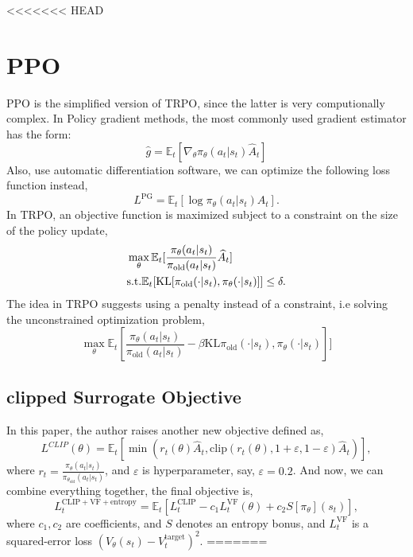 \documentclass[11pt,a4paper]{article}
\def\hat{\widehat}
\def\epsilon{\varepsilon}
\def\E{\mathbb{E}}
\begin{document}
<<<<<<< HEAD
\section{PPO}
PPO\cite{schulman2017proximal} is the simplified version of TRPO, since the latter is very computionally complex. In Policy gradient methods, the most commonly used gradient estimator has the form:
\begin{equation}
\hat{g} = \E_t[\nabla_{\theta}\pi_{\theta}(a_t|s_t)\hat{A}_t]
\end{equation}
Also, use automatic differentiation software, we can optimize the following loss function instead,
\begin{equation}
    L^{\mathrm{PG}} = \E_t[\log\pi_{\theta}(a_t|s_t)A_t].
\end{equation}
In TRPO, an objective function is maximized subject to a constraint on the size of the policy update,
\begin{equation}
\aligned 
    & \max_{\theta} \E_t[\frac{\pi_{\theta}(a_t|s_t)}{\pi_{\mathrm{old}}(a_t|s_t)}\hat{A}_t] \\ 
    & \mathrm{s.t.} \E_t[\mathrm{KL}[\pi_{\mathrm{old}}(\cdot|s_t),\pi_{\theta}(\cdot|s_t)]] \le \delta.
\endaligned 
\end{equation}
The idea in TRPO suggests using a penalty instead of a constraint, i.e solving the unconstrained optimization problem,
\begin{equation}
    \max_{\theta} \E_t[\frac{\pi_{\theta}(a_t|s_t)}{\pi_{\mathrm{old}}(a_t|s_t)} -\beta \mathrm{KL}\pi_{\mathrm{old}}(\cdot|s_t),\pi_{\theta}(\cdot|s_t)]]
\end{equation}

\subsection{clipped Surrogate Objective}
In this paper, the author raises another new objective defined as,
\begin{equation}
L^{CLIP}(\theta) = \E_t[\min(r_t(\theta)\hat{A}_t, \mathrm{clip}(r_t(\theta),1+\epsilon,1-\epsilon)\hat{A}_t)],
\end{equation}
where $r_t = \frac{\pi_{\theta}(a_t|s_t)}{\pi_{\theta_{\mathrm{old}}}(a_t|s_t)}$, and $\epsilon$ is hyperparameter, say, $\epsilon=0.2$.
And now, we can combine everything together, the final objective is,
\begin{equation}
L_{t}^{\mathrm{CLIP}+\mathrm{VF}+\mathrm{entropy}} = \E_t[L_t^{\mathrm{CLIP}}-c_1L_t^{\mathrm{VF}}(\theta)+c_2S[\pi_{\theta}](s_t)],
\end{equation}
where $c_1,c_2$ are coefficients, and $S$ denotes an entropy bonus, and $L_t^{\mathrm{VF}}$ is a squared-error loss $(V_{\theta}(s_t) - V_t^{\mathrm{target}})^2$.
=======
\end{document}
